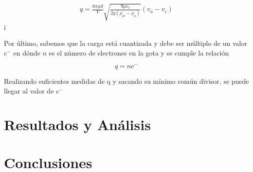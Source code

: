 \documentclass[journal, table]{IEEEtran}
\begin{document}
\begin{equation}
    \begin{split}
        q=\frac{6\pi \mu d}{V}\sqrt{\frac{9\mu v_c}{2g(\rho_{ac}-\rho_a)}}(v_a-v_c)
    \end{split}
\end{equation}i

Por último, sabemos que la carga está cuantizada y debe ser múltiplo de un valor $e^-$ en dónde $n$ es el número de electrones en la gota y se cumple la relación

\begin{equation}
    q=ne^-
\end{equation}

Realizando suficientes medidas de q y sacando su mínimo común divisor, se puede llegar al valor de $e^-$

\section{Resultados y Análisis}


\section{Conclusiones}

\printbibliography
\end{document}
